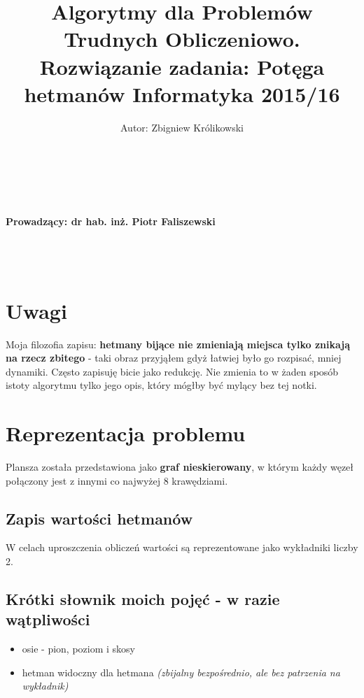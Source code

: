 \documentclass{article}
\author{Autor: Zbigniew Królikowski
\\\\\\\\}
\title{ Algorytmy dla Problemów Trudnych Obliczeniowo.\\
Rozwiązanie zadania: \textbf{Potęga hetmanów}
Informatyka 2015/16}
\begin{document}
\maketitle


\vfill

\paragraph{Prowadzący: dr hab. inż. Piotr Faliszewski
\\\\\\\\
}

\newpage

\section{Uwagi}

Moja filozofia zapisu: \textbf{hetmany bijące nie zmieniają miejsca tylko znikają na rzecz zbitego} - taki obraz przyjąłem gdyż łatwiej było go rozpisać, mniej dynamiki. Często zapisuję bicie jako redukcję. Nie zmienia to w żaden sposób istoty algorytmu tylko jego opis, który mógłby być mylący bez tej notki.

\section{Reprezentacja problemu}

Plansza została przedstawiona jako \textbf{graf nieskierowany}, w którym każdy węzeł połączony jest z innymi co najwyżej 8 krawędziami.

\subsection{Zapis wartości hetmanów}

W celach uproszczenia obliczeń wartości są reprezentowane jako wykładniki liczby 2.

\subsection{Krótki słownik moich pojęć - w razie wątpliwości}

\begin{itemize}
\item osie - pion, poziom i skosy
\item hetman widoczny dla hetmana \textit{(zbijalny bezpośrednio, ale bez patrzenia na wykładnik)}
\end{itemize}
\end{document}
